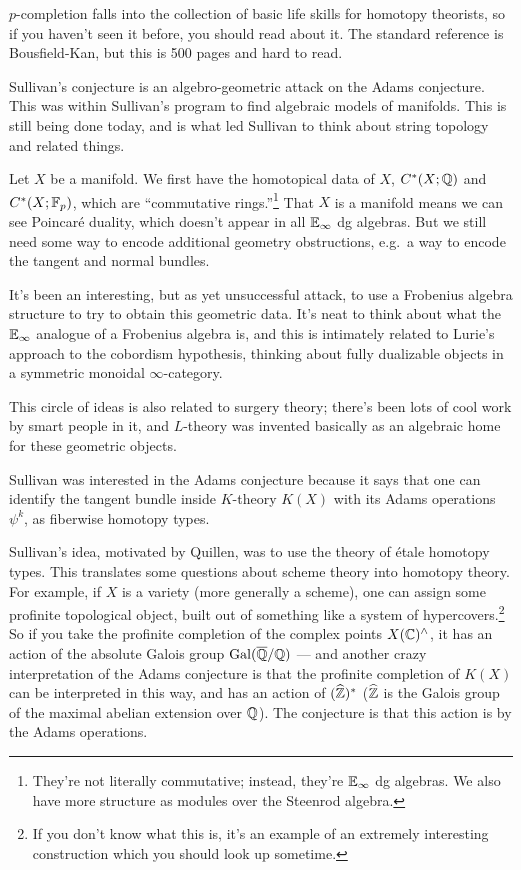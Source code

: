 $p$-completion falls into the collection of basic life skills for homotopy theorists, so if you haven't seen it
before, you should read about it. The standard reference is Bousfield-Kan, but this is 500 pages and hard to read.

Sullivan's conjecture is an algebro-geometric attack on the Adams conjecture. This was within Sullivan's program to
find algebraic models of manifolds. This is still being done today, and is what led Sullivan to think about string
topology and related things.

Let $X$ be a manifold. We first have the homotopical data of $X$, $C^*(X;\mathbb Q)$ and $C^*(X;\mathbb F_p)$, which are
``commutative rings.''\footnote{They're not literally commutative; instead, they're $\mathbb E_\infty$ dg algebras. We
also have more structure as modules over the Steenrod algebra.} That $X$ is a manifold means we can see Poincaré
duality, which doesn't appear in all $\mathbb E_\infty$ dg algebras. But we still need some way to encode additional
geometry obstructions, e.g.\ a way to encode the tangent and normal bundles.

It's been an interesting, but as yet unsuccessful attack, to use a Frobenius algebra structure to try to obtain
this geometric data. It's neat to think about what the $\mathbb E_\infty$ analogue of a Frobenius algebra is, and this is
intimately related to Lurie's approach to the cobordism hypothesis, thinking about fully dualizable objects in a
symmetric monoidal $\infty$-category.

This circle of ideas is also related to surgery theory; there's been lots of cool work by smart people in it, and
$L$-theory was invented basically as an algebraic home for these geometric objects.

Sullivan was interested in the Adams conjecture because it says that one can identify the tangent bundle inside
$K$-theory $K(X)$ with its Adams operations $\psi^k$, as fiberwise homotopy types.

Sullivan's idea, motivated by Quillen, was to use the theory of étale homotopy types. This translates some
questions about scheme theory into homotopy theory. For example, if $X$ is a variety (more generally a scheme), one
can assign some profinite topological object, built out of something like a system of hypercovers.\footnote{If you
don't know what this is, it's an example of an extremely interesting construction which you should look up
sometime.} So if you take the profinite completion of the complex points $X(\mathbb C)^\land$, it has an action of the
absolute Galois group $\operatorname{Gal}(\overline{\mathbb Q}/\mathbb Q)$ --- and another crazy interpretation of the Adams conjecture is that
the profinite completion of $K(X)$ can be interpreted in this way, and has an action of $(\widehat{\mathbb Z})^*$
($\widehat{\mathbb Z}$ is the Galois group of the maximal abelian extension over $\mathbb Q$). The conjecture is that this action
is by the Adams operations.

